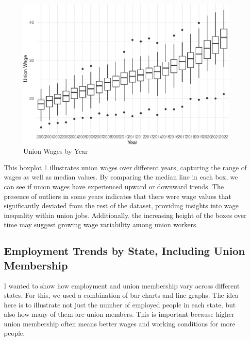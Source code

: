 \documentclass[
]{book}
\theoremstyle{definition}
\theoremstyle{definition}
\theoremstyle{definition}
\theoremstyle{definition}
\theoremstyle{remark}
\begin{document}
\begin{figure}
\centering
\includegraphics{_main_files/figure-latex/wageyear-1.pdf}
\caption{\label{fig:wageyear}Union Wages by Year}
\end{figure}

This boxplot \ref{fig:wageyear} illustrates union wages over different years, capturing the range of wages as well as median values. By comparing the median line in each box, we can see if union wages have experienced upward or downward trends. The presence of outliers in some years indicates that there were wage values that significantly deviated from the rest of the dataset, providing insights into wage inequality within union jobs. Additionally, the increasing height of the boxes over time may suggest growing wage variability among union workers.

\subsection{Employment Trends by State, Including Union Membership}\label{employment-trends-by-state-including-union-membership}

I wanted to show how employment and union membership vary across different states. For this, we used a combination of bar charts and line graphs. The idea here is to illustrate not just the number of employed people in each state, but also how many of them are union members. This is important because higher union membership often means better wages and working conditions for more people.
\end{document}
